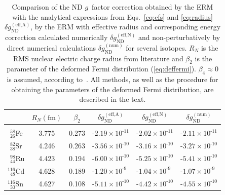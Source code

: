 \begin{table}
\caption{\label{tab:spline}%
Comparison of the ND $g$~factor correction obtained by the ERM with the analytical expressions from Eqs.~\eqref{eq:efs} and \eqref{eq:radius} $\delta g_{\text{ND}}^{(\text{eff,A})}$, by the ERM with effective radius and corresponding energy correction calculated numerically $\delta g_{\text{ND}}^{(\text{eff,N})}$ and non-perturbatively by direct numerical calculations $\delta g_{\text{ND}}^{(\text{num})}$ for several isotopes. $R_N$ is the RMS nuclear electric charge radius from literature \cite{Angeli2013} and $\beta_2$ is the parameter of the deformed Fermi distribution (\ref{eq:deffermi}). $\beta_4 \approx 0$ is assumed, according to~\cite{Moller1995}. All methods, as well as the procedure for obtaining the parameters of the deformed Fermi distribution, are described in the text.
}
\centering
\begin{tabular}{l|ccccc}
 &$R{\scriptstyle _N(\text{fm})}$& $\beta_2$ & $\delta g_{\text{ND}}^{(\text{eff,A})}$ & $\delta g_{\text{ND}}^{(\text{eff,N})}$ & $\delta g_{\text{ND}}^{(\text{num})}$\\
\hline\\[-5pt]
$^{\phantom{0}58}_{\phantom{0}26}$Fe & 3.775 & 0.273 & ${\text{-}}{2.19}{\scriptstyle\times}{10^{\text{-}11}}$ &${\text{-}}{2.02}{\scriptstyle\times}{10^{\text{-}11}}$&${\text{-}}{2.11}{\scriptstyle\times}{10^{\text{-}11}}$\\[4pt]
$^{\phantom{0}82}_{\phantom{0}38}$Sr & 4.246 & 0.263 & ${\text{-}}{3.56}{\scriptstyle\times}{10^{\text{-}10}}$ &${\text{-}}{3.16}{\scriptstyle\times}{10^{\text{-}10}}$&${\text{-}}{3.27}{\scriptstyle\times}{10^{\text{-}10}}$\\[4pt]
$^{\phantom{0}98}_{\phantom{0}44}$Ru & 4.423 & 0.194 & ${\text{-}}{6.00}{\scriptstyle\times}{10^{\text{-}10}}$ &${\text{-}}{5.25}{\scriptstyle\times}{10^{\text{-}10}}$&${\text{-}}{5.41}{\scriptstyle\times}{10^{\text{-}10}}$\\[4pt]
$^{116}_{\phantom{0}48}$Cd           & 4.628 & 0.189 & ${\text{-}}{1.20}{\scriptstyle\times}{10^{\text{-}9\phantom{0}}}$ &${\text{-}}{1.04}{\scriptstyle\times}{10^{\text{-}9\phantom{0}}}$&${\text{-}}{1.07}{\scriptstyle\times}{10^{\text{-}9\phantom{0}}}$\\[4pt]
$^{116}_{\phantom{0}50}$Sn           & 4.627 & 0.108 & ${\text{-}}{5.11}{\scriptstyle\times}{10^{\text{-}10}}$ &${\text{-}}{4.42}{\scriptstyle\times}{10^{\text{-}10}}$&${\text{-}}{4.55}{\scriptstyle\times}{10^{\text{-}10}}$\\[4pt]

\end{tabular}
\end{table}
